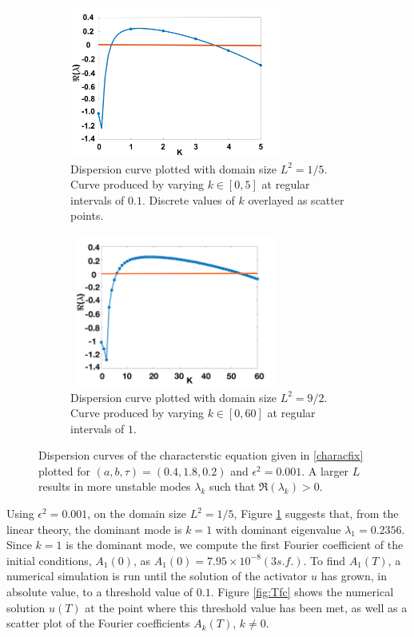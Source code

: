 \begin{figure}[H]
    \centering
    \begin{subfigure}[t]{0.45\textwidth}
        \centering
        \includegraphics[width=7cm,height=5cm]{compdisp1.png}
        \caption{Dispersion curve plotted with domain size $L^2=1/5$. Curve produced by varying $k\in[0,5]$ at regular intervals of $0.1$. Discrete values of $k$ overlayed as scatter points. }
        \label{fig:compdisp1}
    \end{subfigure}
    \hfill
    \begin{subfigure}[t]{0.45\textwidth}
        \centering
        \includegraphics[width=7cm,height=5cm]{compdisp2.png}
        \caption{Dispersion curve plotted with domain size $L^2=9/2$. Curve produced by varying $k\in[0,60]$ at regular intervals of $1$.}
        \label{fig:compdisp2}
    \end{subfigure}
    \caption{Dispersion curves of the characterstic equation given in \eqref{characfix} plotted for $(a,b,\tau)=(0.4,1.8,0.2)$ and $\epsilon^2=0.001$. A larger $L$ results in more unstable modes $\lambda_k$ such that $\Re(\lambda_k)>0$. }
    \label{fig:compardisp}
\end{figure}
Using $\epsilon^2=0.001$, on the domain size $L^2=1/5$, Figure \ref{fig:compdisp1} suggests that, from the linear theory, the dominant mode is $k=1$ with dominant eigenvalue $\lambda_1=0.2356$. Since $k=1$ is the dominant mode, we compute the first Fourier coefficient of the initial conditions, $A_1(0)$, as $A_1(0)=7.95\times10^{-8} (3 s.f.)$. To find $A_1(T)$, a numerical simulation is run until the solution of the activator $u$ has grown, in absolute value, to a threshold value of $0.1$. Figure \ref{fig:Tfc} shows the numerical solution $u(T)$ at the point where this threshold value has been met, as well as a scatter plot of the Fourier coefficients $A_k(T)$, $k\neq0$.
